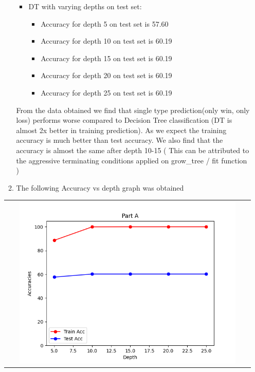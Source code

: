\begin{enumerate}[label=(\alph*)]
\begin{enumerate}[label=\roman*.]
\begin{itemize}
                        \item DT with varying depths on test set:
                              \begin{itemize}
                                  \item Accuracy for depth 5 on test set is 57.60
                                  \item Accuracy for depth 10 on test set is 60.19
                                  \item Accuracy for depth 15 on test set is 60.19
                                  \item Accuracy for depth 20 on test set is 60.19
                                  \item Accuracy for depth 25 on test set is 60.19
                              \end{itemize}
                    \end{itemize}
                    From the data obtained we find that single type prediction(only win, only loss) performs worse compared to Decision Tree classification (DT is almost 2x better in training prediction). As we expect the training accuracy is much better than test accuracy. We also find that the accuracy is almost the same after depth 10-15 ( This can be attributed to the aggressive terminating conditions applied on grow\_tree / fit function )
              \item The following Accuracy vs depth graph was obtained
          \end{enumerate}
          \begin{center}
              \begin{tabular}{c}
                  \includegraphics[width=0.9\textwidth]{./images/q1_part_a.png}
              \end{tabular}
          \end{center}


\end{enumerate}
